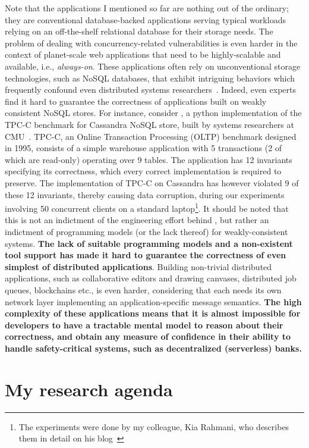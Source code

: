 Note that the applications I mentioned so far are nothing out of the
ordinary; they are conventional database-backed applications serving
typical workloads relying on an off-the-shelf relational database for
their storage needs. The problem of dealing with concurrency-related
vulnerabilities is even harder in the context of planet-scale web
applications that need to be highly-scalable and available, i.e.,
\emph{always-on}. These applications often rely on unconventional
storage technologies, such as NoSQL databases, that exhibit intriguing
behaviors which frequently confound even distributed systems
researchers~\cite{jepsen}. Indeed, even experts find it hard to guarantee the
correctness of applications built on weakly consistent NoSQL stores.
For instance, consider , a python implementation of the
TPC-C benchmark for Cassandra NoSQL store, built by systems
researchers at CMU~\cite{pytpcc}. TPC-C, an Online Transaction
Processing (OLTP) benchmark designed in 1995, consists of a simple
warehouse application with 5 transactions (2 of which are read-only)
operating over 9 tables. The application has 12 invariants specifying
its correctness, which every correct implementation is required to
preserve. The  implementation of TPC-C on Cassandra has
however violated 9 of these 12 invariants, thereby causing data
corruption, during our experiments involving 50 concurrent clients on
a standard laptop\footnote{The experiments were done by my colleague,
Kia Rahmani, who describes them in detail on his blog~\cite{kiablog}}.
It should be noted that this is not an indictment of the engineering
effort behind , but rather an indictment of programming
models (or the lack thereof) for weakly-consistent systems. {\bf The lack
of suitable programming models and a non-existent tool support has
made it hard to guarantee the correctness of even simplest of
distributed applications}. Building non-trivial distributed
applications, such as collaborative editors and drawing canvases,
distributed job queues, blockchains etc., is even harder, considering
that each needs its own network layer implementing an
application-specific message semantics.  {\bf The high complexity of these
applications means that it is almost impossible for developers to have
a tractable mental model to reason about their correctness, and obtain
any measure of confidence in their ability to handle safety-critical
systems, such as decentralized (serverless) banks.}

\section*{My research agenda}

